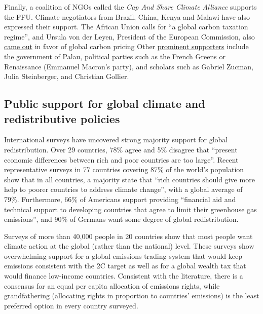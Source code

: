 \documentclass[12pt,english]{article}
\begin{document}
Finally, a coalition of NGOs called the \textit{Cap And Share Climate Alliance} supports the FFU. Climate negotiators from Brazil, China, Kenya and Malawi have also expressed their support. The African Union calls for ``a global carbon taxation regime'',\citep{african_union_african_2023} and Ursula von der Leyen, President of the European Commission, also \href{https://twitter.com/vonderleyen/status/1700416700238225659}{came out} in favor of global carbon pricing Other \href{https://global-redistribution-advocates.org/the-global-climate-plan/}{prominent supporters} include the government of Palau, political parties such as the French Greens or Renaissance (Emmanuel Macron's party), and scholars such as Gabriel Zucman, Julia Steinberger, and Christian Gollier. 


\subsection{Public support for global climate and redistributive policies\label{subsec:public_support}}

International surveys have uncovered strong majority support for global redistribution. Over 29 countries, 78\% agree and 5\% disagree that ``present economic differences between rich and poor countries are too large''.\citep{issp_international_2019} 
Recent representative surveys in 77 countries covering 87\% of the world's population show that in all countries, a majority state that ``rich countries should give more help to poorer countries to address climate change'', with a global average of 79\%.\cite{undp_peoples_2024} Furthermore, 66\% of Americans support providing ``financial aid and technical support to developing countries that agree to limit their greenhouse gas emissions'',\cite{leiserowitz_public_2021} and 90\% of Germans want some degree of global redistribution.\cite{fehr_your_2022}

Surveys of more than 40,000 people in 20 countries show that most people want climate action at the global (rather than the national) level.\citep{fabre_majority_2025,dechezlepretre_fighting_2025} These surveys show overwhelming support for a global emissions trading system that would keep emissions consistent with the 2\textdegree{}C target as well as for a global wealth tax that would finance low-income countries. Consistent with the literature,\citep{carlsson_is_2011,meilland_international_2024,dabla-norris_public_2023} there is a consensus for an equal per capita allocation of emissions rights, while grandfathering (allocating rights in proportion to countries' emissions) is the least preferred option in every country surveyed.
\end{document}
